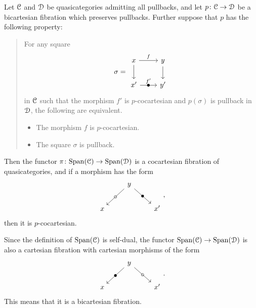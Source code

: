 \documentclass[main.tex]{subfiles}
\begin{document}
\begin{theorem}
  \label{thm:span_of_bicartesian_fibration_is_bicartesian_fibration}
  Let $\mathcal{C}$ and $\mathcal{D}$ be quasicategories admitting all pullbacks, and let $p\colon \mathcal{C} \to \mathcal{D}$ be a bicartesian fibration which preserves pullbacks. Further suppose that $p$ has the following property:

  \begin{quote}
    For any square
    \begin{equation*}
      \sigma =
      \begin{tikzcd}
        x
        \arrow[r, "f"]
        \arrow[d]
        & y
        \arrow[d]
        \\
        x'
        \arrow[r, "f'", "\bullet" marking]
        & y'
      \end{tikzcd}
    \end{equation*}
    in $\mathcal{C}$ such that the morphism $f'$ is $p$-cocartesian and $p(\sigma)$ is pullback in $\mathcal{D}$, the following are equivalent.
    \begin{itemize}
      \item The morphism $f$ is $p$-cocartesian.

      \item The square $\sigma$ is pullback.
    \end{itemize}
  \end{quote}

  Then the functor $\pi\colon \mathrm{Span}(\mathcal{C}) \to \mathrm{Span}(\mathcal{D})$ is a cocartesian fibration of quasicategories, and if a morphism has the form
  \begin{equation*}
    \begin{tikzcd}
      & y
      \arrow[dl, "\circ" marking]
      \arrow[dr, "\bullet" marking]
      \\
      x
      && x'
    \end{tikzcd},
  \end{equation*}
  then it is $p$-cocartesian.
\end{theorem}

\begin{note}
  Since the definition of $\mathrm{Span}(\mathcal{C})$ is self-dual, the functor $\mathrm{Span}(\mathcal{C}) \to \mathrm{Span}(\mathcal{D})$ is also a cartesian fibration with cartesian morphisms of the form
  \begin{equation*}
    \begin{tikzcd}
      & y
      \arrow[dl, "\bullet" marking]
      \arrow[dr, "\circ" marking]
      \\
      x
      && x'
    \end{tikzcd}.
  \end{equation*}
  This means that it is a bicartesian fibration.
\end{note}
\end{document}
